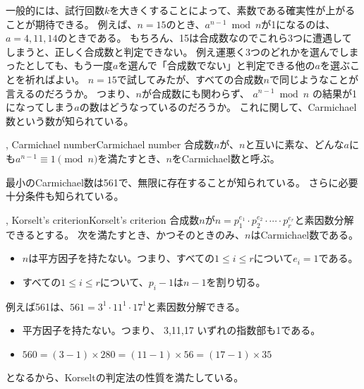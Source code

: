 
一般的には、試行回数$k$を大きくすることによって、素数である確実性が上がることが期待できる。
例えば、$n=15$のとき、$a^{n-1} \bmod{n}$が1になるのは、$a=4,11,14$のときである。
もちろん、15は合成数なのでこれら3つに遭遇してしまうと、正しく合成数と判定できない。
例え運悪く3つのどれかを選んでしまったとしても、もう一度$a$を選んで「合成数でない」と判定できる他の$a$を選ぶことを祈ればよい。
$n=15$で試してみたが、すべての合成数$n$で同じようなことが言えるのだろうか。
つまり、$n$が合成数にも関わらず、 $a^{n−1} \bmod{n}$ の結果が1になってしまう$a$の数はどうなっているのだろうか。
これに関して、Carmichael数という数が知られている。

\begin{Defi}{, Carmichael number}{Carmichael number}
合成数$n$が、$n$と互いに素な、どんな$a$にも$a^{n−1}\equiv 1 \pmod{n}$を満たすとき、$n$をCarmichael数と呼ぶ。
\end{Defi}

最小のCarmichael数は561で、無限に存在することが知られている。
さらに必要十分条件も知られている。

\begin{Theo}{, Korselt's criterion}{Korselt's criterion}
合成数$n$が$n=p_1^{e_1}\cdot p_2^{e_2} \cdot\cdots\cdot p_r^{e_r}$と素因数分解できるとする。
次を満たすとき、かつそのときのみ、$n$はCarmichael数である。
\begin{itemize}
 \item $n$は平方因子を持たない。つまり、すべての$1 \le i \le r$について$e_i=1$である。
 \item すべての$1 \le i \le r$について、$p_i − 1$は$n−1$を割り切る。
\end{itemize}
\end{Theo}

例えば561は、$561=3^1\cdot 11^1 \cdot17^1$と素因数分解できる。
\begin{itemize}
 \item 平方因子を持たない。つまり、 3,11,17 いずれの指数部も1である。
 \item $560 = (3−1) \times 280 = (11−1) \times 56 = (17−1) \times 35$
\end{itemize}
となるから、Korseltの判定法の性質を満たしている。
